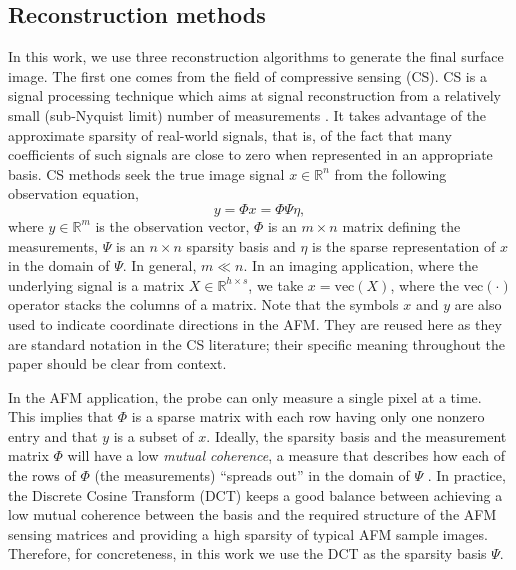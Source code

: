 \documentclass[twocolumn,twoside]{IEEEtran/IEEEtran}
\begin{document}
\subsection{Reconstruction methods}
\label{sec:reconstructionMethods}
	
In this work, we use three reconstruction algorithms to generate the final
surface image. The first one comes from the field of compressive sensing (CS).
CS is a signal processing technique which aims at signal reconstruction from a
relatively small (sub-Nyquist limit) number of measurements
\cite{carmi2014compressive}. It takes advantage of the approximate sparsity of
real-world signals, that is, of the fact that many coefficients of such signals
are close to zero when represented in an appropriate basis. CS methods seek the
true image signal $x\in\mathbb{R}^n$ from the following observation equation,
\begin{equation}\label{op:observation}
  y = \Phi x = \Phi\Psi\eta,
\end{equation}
\noindent where $y\in\mathbb{R}^m$ is the observation vector, $\Phi$ is an
$m\times n$ matrix defining the measurements, $\Psi$ is an $n\times n$ sparsity
basis and $\eta$ is the sparse representation of $x$ in the domain of $\Psi$. In
general, $m\ll n$. In an imaging application, where the underlying signal is a
matrix $X\in\mathbb{R}^{h\times s}$, we take $x=\text{vec}(X)$, where the
$\text{vec}(\cdot)$ operator stacks the columns of a matrix. Note that the
symbols $x$ and $y$ are also used to indicate coordinate directions in the AFM.
They are reused here as they are standard notation in the CS literature; their
specific meaning throughout the paper should be clear from context.
	
In the AFM application, the probe can only measure a single pixel at a time.
This implies that $\Phi$ is a sparse matrix with each row having only one
nonzero entry and that $y$ is a subset of $x$. Ideally, the sparsity basis and
the measurement matrix $\Phi$ will have a low \textit{mutual coherence}, a
measure that describes how each of the rows of $\Phi$ (the measurements)
``spreads out'' in the domain of $\Psi$ \cite{candes2007sparsity}. In practice,
the Discrete Cosine Transform (DCT) keeps a good balance between achieving a low
mutual coherence between the basis and the required structure of the AFM sensing
matrices and providing a high sparsity of typical AFM sample images. Therefore,
for concreteness, in this work we use the DCT as the sparsity basis $\Psi$.
	
\end{document}
